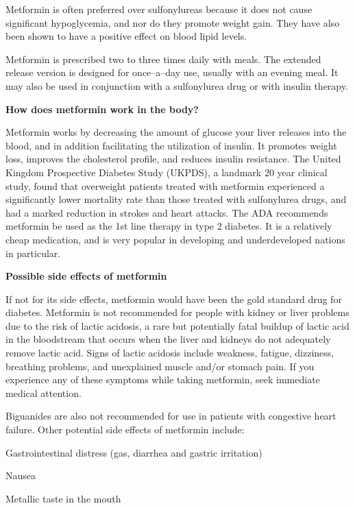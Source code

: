 Metformin is often preferred over sulfonylureas because it does not cause significant hypoglycemia, and nor do they promote weight gain. They have also been shown to have a positive effect on blood lipid levels.

Metformin is prescribed two to three times daily with meals. The extended release version is designed for once–a–day use, usually with an evening meal. It may also be used in conjunction with a sulfonylurea drug or with insulin therapy.

\textbf{How does metformin work in the body?}

Metformin works by decreasing the amount of glucose your liver releases into the blood, and in addition facilitating the utilization of insulin. It promotes weight loss, improves the cholesterol profile, and reduces insulin resistance. The United Kingdom Prospective Diabetes Study (UKPDS), a landmark 20 year clinical study, found that overweight patients treated with metformin experienced a significantly lower mortality rate than those treated with sulfonylurea drugs, and had a marked reduction in strokes and heart attacks. The ADA recommends metformin be used as the 1st line therapy in type 2 diabetes. It is a relatively cheap medication, and is very popular in developing and underdeveloped nations in particular.

\textbf{Possible side effects of metformin}

If not for its side effects, metformin would have been the gold standard drug for diabetes. Metformin is not recommended for people with kidney or liver problems due to the risk of lactic acidosis, a rare but potentially fatal buildup of lactic acid in the bloodstream that occurs when the liver and kidneys do not adequately remove lactic acid. Signs of lactic acidosis include weakness, fatigue, dizziness, breathing problems, and unexplained muscle and/or stomach pain. If you experience any of these symptoms while taking metformin, seek immediate medical attention.

Biguanides are also not recommended for use in patients with congestive heart failure. Other potential side effects of metformin include:

\item Gastrointestinal distress (gas, diarrhea and gastric irritation)

 \item Nausea

 \item Metallic taste in the mouth

